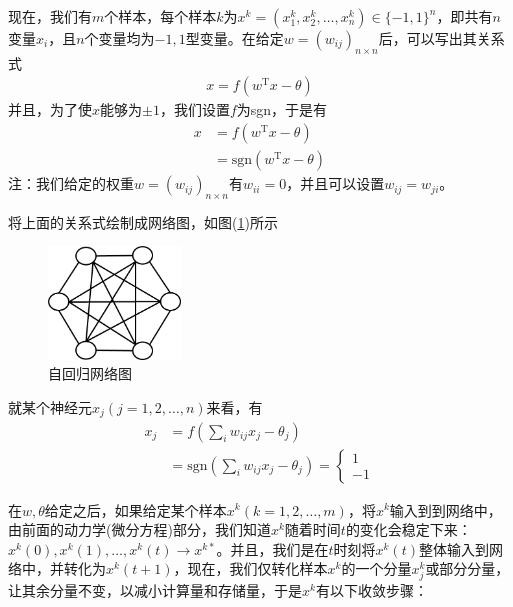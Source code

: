 {            \par
            现在，我们有$m$个样本，每个样本$k$为$x^k = (x_1^k,x_2^k,\dots,x_n^k)\in \{-1,1\}^n$，即共有$n$变量$x_i$，且$n$个变量均为$-1,1$型变量。在给定$w = (w_{ij})_{n\times n}$后，可以写出其关系式
            \begin{align*}
            x = f(w^\mathrm{T}x - \theta)
            \end{align*}
            并且，为了使$x$能够为$\pm 1$，我们设置$f$为sgn，于是有
            \begin{align*}
            x & = f(w^\mathrm{T}x - \theta)\\
            & = \mathrm{sgn}(w^\mathrm{T}x - \theta)
            \end{align*}
            注：我们给定的权重$w = (w_{ij})_{n\times n}$有$w_{ii} = 0$，并且可以设置$w_{ij} = w_{ji}$。
            \par
            将上面的关系式绘制成网络图，如图(\ref{fig:自回归网络图})所示
            \begin{figure}[H]
            \centering
            \includegraphics[height=3cm]{images/autoregressive_network.jpg}
            \caption{自回归网络图}
            \label{fig:自回归网络图}
            \end{figure}
            就某个神经元$x_j(j=1,2,\dots,n)$来看，有
            \begin{align*}
            x_j & = f\left(\sum_i w_{ij}x_j -\theta_j\right)\\
            & =\mathrm{sgn}\left(\sum_i w_{ij}x_j -\theta_j\right) =
            \left\{
            \begin{aligned}
            1\\
            -1
            \end{aligned}
            \right.
            \end{align*}
            \par
            在$w,\theta$给定之后，如果给定某个样本$x^k(k = 1,2,\dots,m)$，将$x^k$输入到到网络中，由前面的动力学(微分方程)部分，我们知道$x^k$随着时间$t$的变化会稳定下来：$x^k(0),x^k(1),\dots,x^k(t)\rightarrow x^{k*}$。并且，我们是在$t$时刻将$x^k(t)$整体输入到网络中，并转化为$x^k(t+1)$，现在，我们仅转化样本$x^k$的一个分量$x_j^k$或部分分量，让其余分量不变，以减小计算量和存储量，于是$x^k$有以下收敛步骤：\\
}
